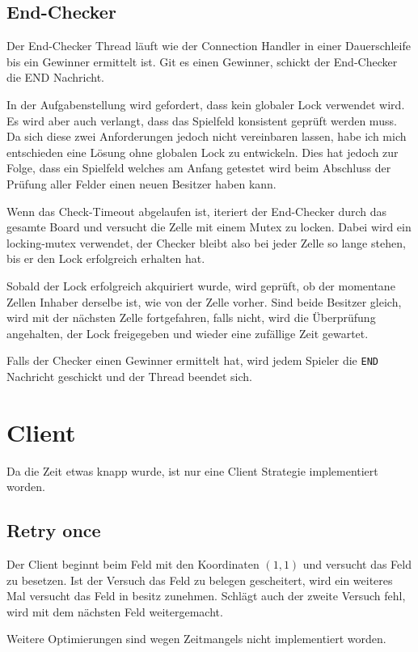 \subsection{End-Checker}
Der End-Checker Thread läuft wie der Connection Handler in einer Dauerschleife bis ein Gewinner ermittelt ist. Git es einen Gewinner, schickt der End-Checker die END Nachricht.

In der Aufgabenstellung wird gefordert, dass kein globaler Lock verwendet wird. Es wird aber auch verlangt, dass das Spielfeld konsistent geprüft werden muss. Da sich diese zwei Anforderungen jedoch nicht vereinbaren lassen, habe ich mich entschieden eine Lösung ohne globalen Lock zu entwickeln. Dies hat jedoch zur Folge, dass ein Spielfeld welches am Anfang getestet wird beim Abschluss der Prüfung aller Felder einen neuen Besitzer haben kann.

Wenn das Check-Timeout abgelaufen ist, iteriert der End-Checker durch das gesamte Board und versucht die Zelle mit einem Mutex zu locken. Dabei wird ein locking-mutex verwendet, der Checker bleibt also bei jeder Zelle so lange stehen, bis er den Lock erfolgreich erhalten hat. 

Sobald der Lock erfolgreich akquiriert wurde, wird geprüft, ob der momentane Zellen Inhaber derselbe ist, wie von der Zelle vorher. Sind beide Besitzer gleich, wird mit der nächsten Zelle fortgefahren, falls nicht, wird die Überprüfung angehalten, der Lock freigegeben und wieder eine zufällige Zeit gewartet.

Falls der Checker einen Gewinner ermittelt hat, wird jedem Spieler die \texttt{END} Nachricht geschickt und der Thread beendet sich.  

\section{Client}
Da die Zeit etwas knapp wurde, ist nur eine Client Strategie implementiert worden.

\subsection{Retry once}
Der Client beginnt beim Feld mit den Koordinaten $(1, 1)$ und versucht das Feld zu besetzen. Ist der Versuch das Feld zu belegen gescheitert, wird ein weiteres Mal versucht das Feld in besitz zunehmen. Schlägt auch der zweite Versuch fehl, wird mit dem nächsten Feld weitergemacht.

Weitere Optimierungen sind wegen Zeitmangels nicht implementiert worden.


